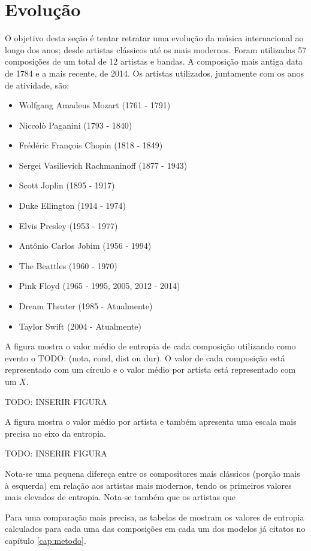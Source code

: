 

\section{Evolução}

O objetivo desta seção é tentar retratar uma evolução da música internacional ao longo dos anos; desde artistas clássicos até os mais modernos. Foram utilizadas 57 composições de um total de 12 artistas e bandas. A composição mais antiga data de 1784 e a mais recente, de 2014. Os artistas utilizados, juntamente com os anos de atividade, são:

\begin{itemize}
    \item Wolfgang Amadeus Mozart (1761 - 1791) \cite{midiworld}
    \item Niccolò Paganini (1793 - 1840) \cite{midimelody}
    \item Frédéric François Chopin (1818 - 1849) \cite{midiworld}
    \item Sergei Vasilievich Rachmaninoff (1877 - 1943) \cite{midiworld}
    \item Scott Joplin (1895 - 1917) \cite{trachtman}
    \item Duke Ellington (1914 - 1974) \cite{midimelody}
    \item Elvis Presley (1953 - 1977) \cite{midiworld}
    \item Antônio Carlos Jobim (1956 - 1994) \cite{wersi}
    \item The Beattles (1960 - 1970) \cite{midiworld}
    \item Pink Floyd (1965 - 1995, 2005, 2012 - 2014) \cite{midiworld}
    \item Dream Theater (1985 - Atualmente) \cite{freemidi}
    \item Taylor Swift (2004 - Atualmente) \cite{freemidi}
\end{itemize}
A figura
mostra o valor médio de entropia de cada composição utilizando como evento o TODO: (nota, cond, dist ou dur). O valor de cada composição está representado com um círculo e o valor médio por artista está representado com um $X$. 

TODO: INSERIR FIGURA

A figura
mostra o valor médio por artista e também apresenta uma escala mais precisa no eixo da entropia.

TODO: INSERIR FIGURA

Nota-se uma pequena difereça entre os compositores mais clássicos (porção mais à esquerda) em relação aos artistas mais modernos, tendo os primeiros valores mais elevados de entropia. Nota-se também que os artistas que 

Para uma comparação mais precisa, as tabelas de
mostram os valores de entropia calculados para cada uma das composições em cada um dos modelos já citatos no capítulo \ref{cap:metodo}.
% 